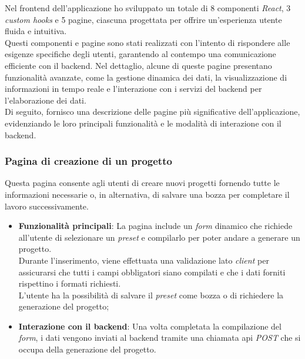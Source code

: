 \noindent Nel \gls{frontend} dell'applicazione ho sviluppato un totale di 8 componenti \textit{React}, 3 \textit{custom hooks} e 5 pagine, ciascuna progettata per offrire un'esperienza utente fluida e intuitiva.\\
Questi componenti e pagine sono stati realizzati con l'intento di rispondere alle esigenze specifiche degli utenti, garantendo al contempo una comunicazione efficiente con il \gls{backend}. Nel dettaglio, alcune di queste pagine presentano funzionalità avanzate, come la gestione dinamica dei dati, la visualizzazione di informazioni in tempo reale e l'interazione con i servizi del \gls{backend} per l'elaborazione dei dati.\\

\noindent Di seguito, fornisco una descrizione delle pagine più significative dell'applicazione, evidenziando le loro principali funzionalità e le modalità di interazione con il \gls{backend}.

\subsubsection{Pagina di creazione di un progetto}
Questa pagina consente agli utenti di creare nuovi progetti fornendo tutte le informazioni necessarie o, in alternativa, di salvare una bozza per completare il lavoro successivamente. 
\begin{itemize}
    \item \textbf{Funzionalità principali}: La pagina include un \textit{form} dinamico che richiede all'utente di selezionare un \textit{preset} e compilarlo per poter andare a generare un progetto.\\ 
    Durante l'inserimento, viene effettuata una validazione lato \textit{client} per assicurarsi che tutti i campi obbligatori siano compilati e che i dati forniti rispettino i formati richiesti. \\
    L'utente ha la possibilità di salvare il \textit{preset} come bozza o di richiedere la generazione del progetto;
    \item \textbf{Interazione con il \gls{backend}}: Una volta completata la compilazione del \textit{form}, i dati vengono inviati al \gls{backend} tramite una chiamata \gls{api} \textit{POST} che si occupa della generazione del progetto.\\
\end{itemize}


